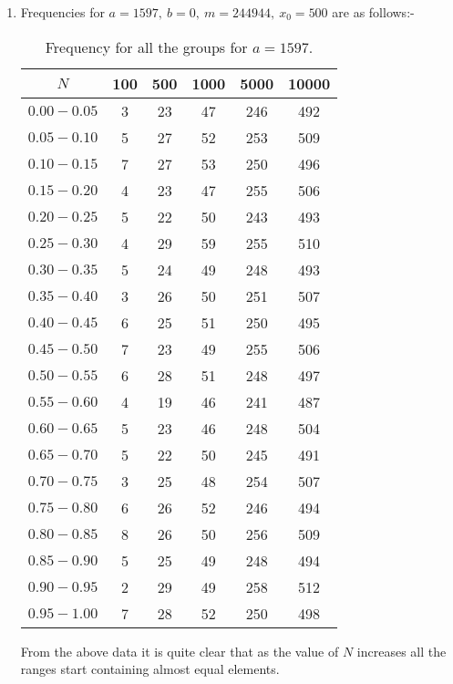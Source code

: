 \documentclass[10pt]{article}
\begin{document}
\begin{enumerate}

\item Frequencies for $a = 1597,\: b = 0, \: m = 244944,\: x_0 = 500$ are as follows:- 

\begin{table}[H]
\begin{center}
\begin{tabular}{|c|c|c|c|c|c|}
\hline
$N$ & 100 & 500 & 1000 & 5000 & 10000\\
\hline
$0.00-0.05$ & 3 & 23 & 47 & 246 & 492\\
\hline
$0.05-0.10$ & 5& 27 & 52 & 253 & 509\\
\hline
$0.10-0.15$ & 7 & 27 & 53 & 250 & 496\\
\hline
$0.15-0.20$ & 4 & 23 & 47 & 255 & 506\\
\hline
$0.20-0.25$ & 5 & 22 & 50 & 243 & 493\\
\hline
$0.25-0.30$ & 4 & 29 & 59 & 255 & 510\\
\hline
$0.30-0.35$ & 5 & 24 & 49 & 248 & 493\\
\hline
$0.35-0.40$ & 3 & 26 & 50 & 251 & 507\\
\hline
$0.40-0.45$ & 6 & 25 & 51 & 250 & 495\\
\hline
$0.45-0.50$ & 7 & 23 & 49 & 255 & 506\\
\hline
$0.50-0.55$ & 6 & 28 & 51 & 248 & 497\\
\hline
$0.55-0.60$ & 4 & 19 & 46 & 241 & 487\\
\hline
$0.60-0.65$ & 5 & 23 & 46 & 248 & 504\\
\hline
$0.65-0.70$ & 5 & 22 & 50 & 245 & 491\\
\hline
$0.70-0.75$ & 3 & 25 & 48 & 254 & 507\\
\hline
$0.75-0.80$ & 6 & 26 & 52 & 246 & 494\\
\hline
$0.80-0.85$ & 8 & 26 & 50 & 256 & 509\\
\hline
$0.85-0.90$ & 5 & 25 & 49 & 248 & 494\\
\hline
$0.90-0.95$ & 2 & 29 & 49 & 258 & 512\\
\hline
$0.95-1.00$ & 7 & 28 & 52 & 250 & 498\\
\hline
\end{tabular}
\end{center}
\caption{Frequency for all the groups for $a = 1597$.}
\label{tab:q2_seq1}
\end{table}
\medskip

From the above data it is quite clear that as the value of $N$ increases all the ranges start containing almost equal elements.


\end{enumerate}
\end{document}
